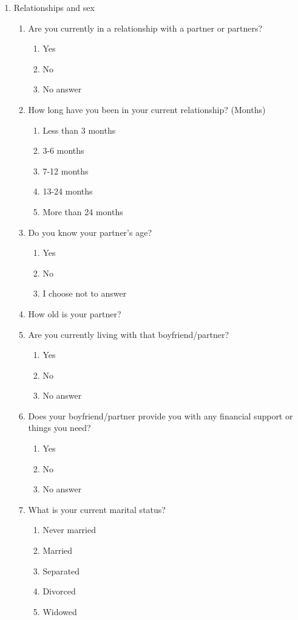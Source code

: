 \begin{enumerate}
    \item Relationships and sex
    \begin{enumerate}
        \item Are you currently in a relationship with a partner or partners?
            \begin{enumerate}
                \item Yes
                \item No
                \item No answer
            \end{enumerate}  
        \item How long have you been in your current relationship? (Months)
        \begin{enumerate}
            \item Less than 3 months
            \item 3-6 months
            \item 7-12 months
            \item 13-24 months
            \item More than 24 months
        \end{enumerate}
        \item Do you know your partner's age?
            \begin{enumerate}
                \item Yes
                \item No
                \item I choose not to answer
            \end{enumerate}  
        \item How old is your partner?
        \item Are you currently living with that boyfriend/partner?
            \begin{enumerate}
                \item Yes
                \item No
                \item No answer
            \end{enumerate}  
        \item Does your boyfriend/partner provide you with any financial support or things you need?
            \begin{enumerate}
                \item Yes
                \item No
                \item No answer
            \end{enumerate}  
        \item What is your current marital status?
        \begin{enumerate}
            \item Never married
            \item Married
            \item Separated
            \item Divorced
            \item Widowed
        \end{enumerate}
    \end{enumerate}


\end{enumerate}
